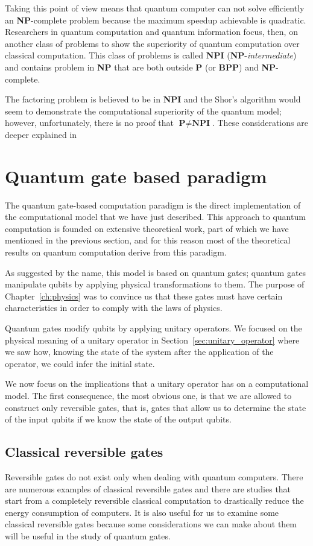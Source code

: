 Taking this point of view means that quantum computer can not solve efficiently an \textbf{NP}-complete problem because the maximum speedup achievable is quadratic. Researchers in quantum computation and quantum information focus, then, on another class of problems to show the superiority of quantum computation over classical computation. This class of problems is called \textbf{NPI} (\textbf{NP}-\emph{intermediate}) and contains problem in \textbf{NP} that are both outside \textbf{P} (or \textbf{BPP}) and \textbf{NP}-complete. 

The factoring problem is believed to be in \textbf{NPI} and the Shor's algorithm would seem to demonstrate the computational superiority of the quantum model; however, unfortunately, there is no proof that $\textbf{P} \neq \textbf{NPI}$. These considerations are deeper explained in \cite[pages 150, 151, 270 and 271]{nielsen2010quantum}

\section{Quantum gate based paradigm}
\label{sec:gate_model}
The quantum gate-based computation paradigm is the direct implementation of the computational model that we have just described. This approach to quantum computation is founded on extensive theoretical work, part of which we have mentioned in the previous section, and for this reason most of the theoretical results on quantum computation derive from this paradigm.

As suggested by the name, this model is based on quantum gates; quantum gates manipulate qubits by applying physical transformations to them. The purpose of Chapter~\ref{ch:physics} was to convince us that these gates must have certain characteristics in order to comply with the laws of physics.

Quantum gates modify qubits by applying unitary operators. We focused on the physical meaning of a unitary operator in Section~\ref{sec:unitary_operator} where we saw how, knowing the state of the system after the application of the operator, we could infer the initial state.

We now focus on the implications that a unitary operator has on a computational model. The first consequence, the most obvious one, is that we are allowed to construct only reversible gates, that is, gates that allow us to determine the state of the input qubits if we know the state of the output qubits.

\subsection{Classical reversible gates}
\label{sec:reversible_gate}
Reversible gates do not exist only when dealing with quantum computers. There are numerous examples of classical reversible gates and there are studies that start from a completely reversible classical computation to drastically reduce the energy consumption of computers. It is also useful for us to examine some classical reversible gates because some considerations we can make about them will be useful in the study of quantum gates.

